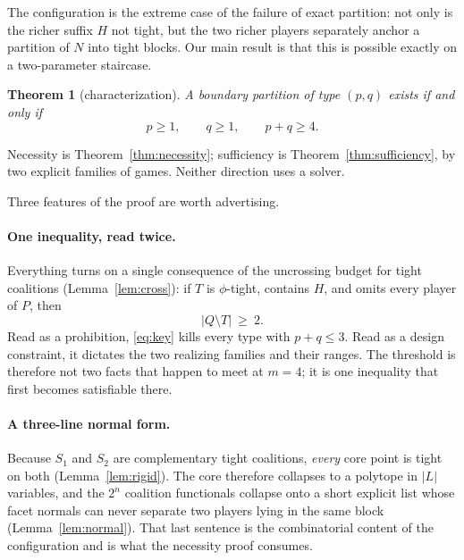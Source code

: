 \documentclass[11pt]{article}
\newtheorem{theorem}{Theorem}
\begin{document}
The configuration is the extreme case of the failure of exact partition: not
only is the richer suffix $H$ not tight, but the two richer players separately
anchor a partition of $N$ into tight blocks.  Our main result is that this is
possible exactly on a two-parameter staircase.

\begin{theorem}[characterization]\label{thm:main}
A boundary partition of type $(p,q)$ exists if and only if
\[
 p\ge1,\qquad q\ge1,\qquad p+q\ge4 .
\]
\end{theorem}

Necessity is Theorem~\ref{thm:necessity}; sufficiency is
Theorem~\ref{thm:sufficiency}, by two explicit families of games.  Neither
direction uses a solver.

Three features of the proof are worth advertising.

\paragraph{One inequality, read twice.}
Everything turns on a single consequence of the uncrossing budget for tight
coalitions (Lemma~\ref{lem:cross}): if $T$ is $\phi$-tight, contains $H$, and
omits every player of $P$, then
\begin{equation}\label{eq:key}
 |Q\setminus T|\ \ge\ 2 .
\end{equation}
Read as a prohibition, \eqref{eq:key} kills every type with $p+q\le3$.  Read as
a design constraint, it dictates the two realizing families and their ranges.
The threshold is therefore not two facts that happen to meet at $m=4$; it is
one inequality that first becomes satisfiable there.

\paragraph{A three-line normal form.}
Because $S_1$ and $S_2$ are complementary tight coalitions, \emph{every} core
point is tight on both (Lemma~\ref{lem:rigid}).  The core therefore collapses
to a polytope in $|L|$ variables, and the $2^{n}$ coalition functionals
collapse onto a short explicit list whose facet normals can never separate two
players lying in the same block (Lemma~\ref{lem:normal}).  That last sentence
is the combinatorial content of the configuration and is what the necessity
proof consumes.
\end{document}
